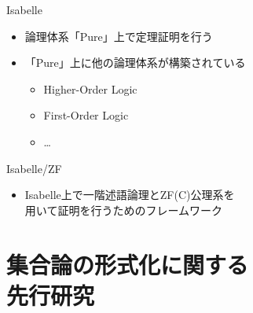 \documentclass[17pt,aspectratio=169]{beamer}
\begin{document}

\begin{frame}{Isabelle}
    \begin{itemize}
        \item 論理体系「Pure」上で定理証明を行う
        \item 「Pure」上に他の論理体系が構築されている
              {\small \begin{itemize}
                  \item Higher-Order Logic
                  \item First-Order Logic \\
                  \item \dots
              \end{itemize} }
    \end{itemize}
    \vspace{-10pt}
\end{frame}


\begin{frame}{Isabelle/ZF}
    \begin{itemize}
        \item Isabelle上で一階述語論理とZF(C)公理系を\\用いて証明を行うためのフレームワーク
    \end{itemize}
\end{frame}



\section{集合論の形式化に関する\\先行研究 }
\end{document}
